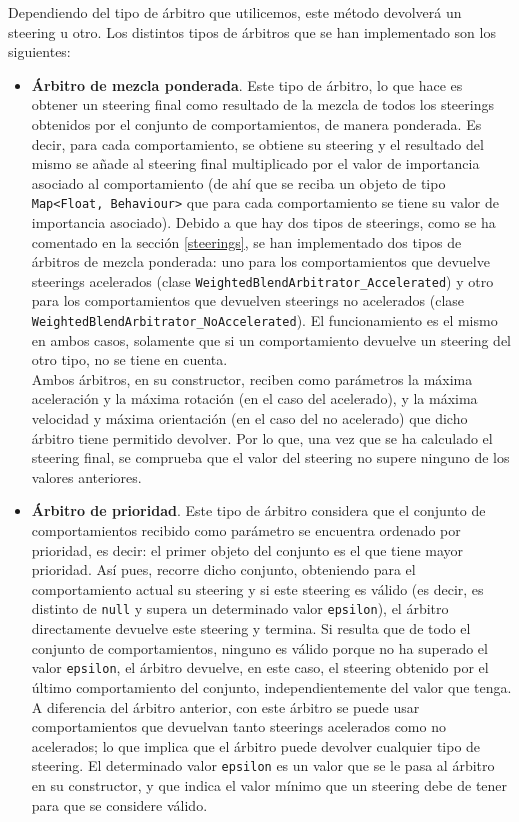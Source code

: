 Dependiendo del tipo de árbitro que utilicemos, este método devolverá un steering u otro. Los distintos tipos de árbitros que se han implementado son los siguientes:
\begin{itemize}
 \item \textbf{Árbitro de mezcla ponderada}. Este tipo de árbitro, lo que hace es obtener un steering final como resultado de la mezcla de todos los steerings obtenidos por el conjunto de comportamientos, de manera ponderada. Es decir, para cada comportamiento, se obtiene su steering y el resultado del mismo se añade al steering final multiplicado por el valor de importancia asociado al comportamiento (de ahí que se reciba un objeto de tipo \texttt{Map<Float, Behaviour>} que para cada comportamiento se tiene su valor de importancia asociado). Debido a que hay dos tipos de steerings, como se ha comentado en la sección \ref{steerings}, se han implementado dos tipos de árbitros de mezcla ponderada: uno para los comportamientos que devuelve steerings acelerados (clase \texttt{WeightedBlendArbitrator\_Accelerated}) y otro para los comportamientos que devuelven steerings no acelerados (clase \texttt{WeightedBlendArbitrator\_NoAccelerated}). El funcionamiento es el mismo en ambos casos, solamente que si un comportamiento devuelve un steering del otro tipo, no se tiene en cuenta. \\
 
 Ambos árbitros, en su constructor, reciben como parámetros la máxima aceleración y la máxima rotación (en el caso del acelerado), y la máxima velocidad y máxima orientación (en el caso del no acelerado) que dicho árbitro tiene permitido devolver. Por lo que, una vez que se ha calculado el steering final, se comprueba que el valor del steering no supere ninguno de los valores anteriores. \\
 
 
 \item \textbf{Árbitro de prioridad}. Este tipo de árbitro considera que el conjunto de comportamientos recibido como parámetro se encuentra ordenado por prioridad, es decir: el primer objeto del conjunto es el que tiene mayor prioridad. Así pues, recorre dicho conjunto, obteniendo para el comportamiento actual su steering y si este steering es válido (es decir, es distinto de \texttt{null} y supera un determinado valor \texttt{epsilon}), el árbitro directamente devuelve este steering y termina. Si resulta que de todo el conjunto de comportamientos, ninguno es válido porque no ha superado el valor \texttt{epsilon}, el árbitro devuelve, en este caso, el steering obtenido por el último comportamiento del conjunto, independientemente del valor que tenga. \\
 
 A diferencia del árbitro anterior, con este árbitro se puede usar comportamientos que devuelvan tanto steerings acelerados como no acelerados; lo que implica que el árbitro puede devolver cualquier tipo de steering. El determinado valor \texttt{epsilon} es un valor que se le pasa al árbitro en su constructor, y que indica el valor mínimo que un steering debe de tener para que se considere válido.
\end{itemize}







